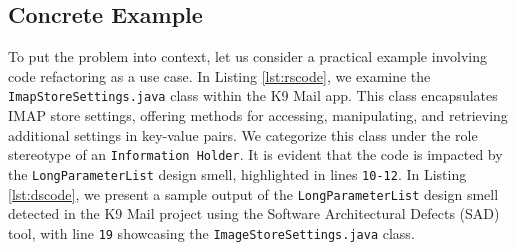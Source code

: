 \documentclass[AMA,Times1COL]{WileyNJDv5} %
\begin{document}
\subsection{Concrete Example}
%
To put the problem into context, let us consider a practical example involving code refactoring as a use case. In Listing \ref{lst:rscode}, we examine the {\tt ImapStoreSettings.java} class within the K9 Mail app. This class encapsulates IMAP store settings, offering methods for accessing, manipulating, and retrieving additional settings in key-value pairs. We categorize this class under the role stereotype of an {\tt Information Holder}. It is evident that the code is impacted by the {\tt LongParameterList} design smell, highlighted in lines {\tt 10-12}. In Listing \ref{lst:dscode}, we present a sample output of the {\tt LongParameterList} design smell detected in the K9 Mail project using the Software Architectural Defects (SAD) tool, with line {\tt 19} showcasing the {\tt ImageStoreSettings.java} class.
\end{document}
